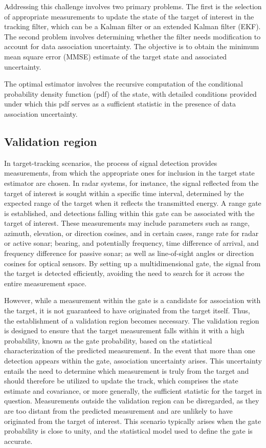Addressing this challenge involves two primary problems. The first is the selection of appropriate measurements to update the state of the target of interest in the tracking filter, which can be a Kalman filter or an extended Kalman filter (EKF). The second problem involves determining whether the filter needs modification to account for data association uncertainty. The objective is to obtain the minimum mean square error (MMSE) estimate of the target state and associated uncertainty.

The optimal estimator involves the recursive computation of the conditional probability density function (pdf) of the
state, with detailed conditions provided under which this pdf serves as a sufficient statistic in the presence of
data association uncertainty.
  \subsection{Validation region}
    \label{sec:validation_region}
In target-tracking scenarios, the process of signal detection provides measurements, from which the appropriate ones for inclusion in the target state estimator are chosen. In radar systems, for instance, the signal reflected from the target of interest is sought within a specific time interval, determined by the expected range of the target when it reflects the transmitted energy. A range gate is established, and detections falling within this gate can be associated with the target of interest. These measurements may include parameters such as range, azimuth, elevation, or direction cosines, and in certain cases, range rate for radar or active sonar; bearing, and potentially frequency, time difference of arrival, and frequency difference for passive sonar; as well as line-of-sight angles or direction cosines for optical sensors. By setting up a multidimensional gate, the signal from the target is detected efficiently, avoiding the need to search for it across the entire measurement space.

However, while a measurement within the gate is a candidate for association with the target, it is not guaranteed to have originated from the target itself. Thus, the establishment of a validation region becomes necessary. The validation region is designed to ensure that the target measurement falls within it with a high probability, known as the gate probability, based on the statistical characterization of the predicted measurement. In the event that more than one detection appears within the gate, association uncertainty arises. This uncertainty entails the need to determine which measurement is truly from the target and should therefore be utilized to update the track, which comprises the state estimate and covariance, or more generally, the sufficient statistic for the target in question. Measurements outside the validation region can be disregarded, as they are too distant from the predicted measurement and are unlikely to have originated from the target of interest. This scenario typically arises when the gate probability is close to unity, and the statistical model used to define the gate is accurate.
